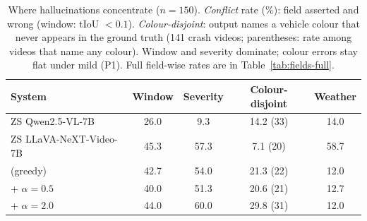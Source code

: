 \begin{table}[!t]
\centering
\caption{Where hallucinations concentrate ($n{=}150$). \emph{Conflict} rate (\%): field asserted and wrong (window: tIoU $<0.1$). \emph{Colour-disjoint}: output names a vehicle colour that never appears in the ground truth (141 crash videos; parentheses: rate among videos that name any colour). Window and severity dominate; colour errors stay flat under mild \tcd{} (P1). Full field-wise rates are in Table~\ref{tab:fields-full}.}
\label{tab:fields}
\small
\setlength{\tabcolsep}{10pt}
\begin{tabular*}{\textwidth}{@{\extracolsep{\fill}}lcccc@{}}
\toprule
\textbf{System} & \textbf{Window} & \textbf{Severity} & \textbf{Colour-disjoint} & \textbf{Weather} \\
\midrule
ZS Qwen2.5-VL-7B        & 26.0 & 9.3  & 14.2 (33) & 14.0 \\
ZS LLaVA-NeXT-Video-7B  & 45.3 & 57.3 & 7.1 (20)  & 58.7 \\
\midrule
\crashlogic{} (greedy)  & 42.7 & 54.0 & 21.3 (22) & 12.0 \\
\crashlogic{} + \tcd{} $\alpha{=}0.5$ & 40.0 & 51.3 & 20.6 (21) & 12.7 \\
\crashlogic{} + \tcd{} $\alpha{=}2.0$ & 44.0 & 60.0 & 29.8 (31) & 12.0 \\
\bottomrule
\end{tabular*}
\end{table}
